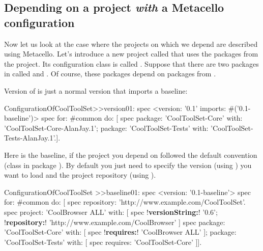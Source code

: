 \documentclass[a4paper,10pt,twoside]{book}
\begin{document}
\subsection{Depending on a project \emph{with} a Metacello configuration}
Now let us look at the case where the projects on which we depend are described using Metacello.
Let's introduce a new project called  that uses the packages from the  project.  Its configuration class is called .   Suppose that there are two packages in  called  and . Of course, these packages depend on packages from . 

Version  of  is just a normal version that imports a baseline:
\begin{code}{}
ConfigurationOfCoolToolSet>>version01: spec 
       <version: '0.1' imports: #('0.1-baseline')>
       spec for: #common do: [
              spec 
                     package: 'CoolToolSet-Core' with: 'CoolToolSet-Core-AlanJay.1';
                     package: 'CoolToolSet-Tests' with: 'CoolToolSet-Tests-AlanJay.1'.].       
\end{code}       

\noindent
Here is the baseline, if the project you depend on followed the default convention (\ie class  in package ). By default you just need to specify the version (using ) you want to load and the project repository (using ). 

\begin{code}{}
ConfigurationOfCoolToolSet >>baseline01: spec 
       <version: '0.1-baseline'>
       spec for: #common do: [
              spec repository: 'http://www.example.com/CoolToolSet'.
              spec project: 'CoolBrowser ALL' with: [
                            spec 
                               !\textbf{versionString:}! '0.6';
                               !\textbf{repository:}! 'http://www.example.com/CoolBrowser' ]
              spec 
                     package: 'CoolToolSet-Core' with: [ spec !\textbf{requires:}! 'CoolBrowser ALL' ];
                     package: 'CoolToolSet-Tests' with: [ spec requires: 'CoolToolSet-Core' ]].
\end{code}  
   
\end{document}
